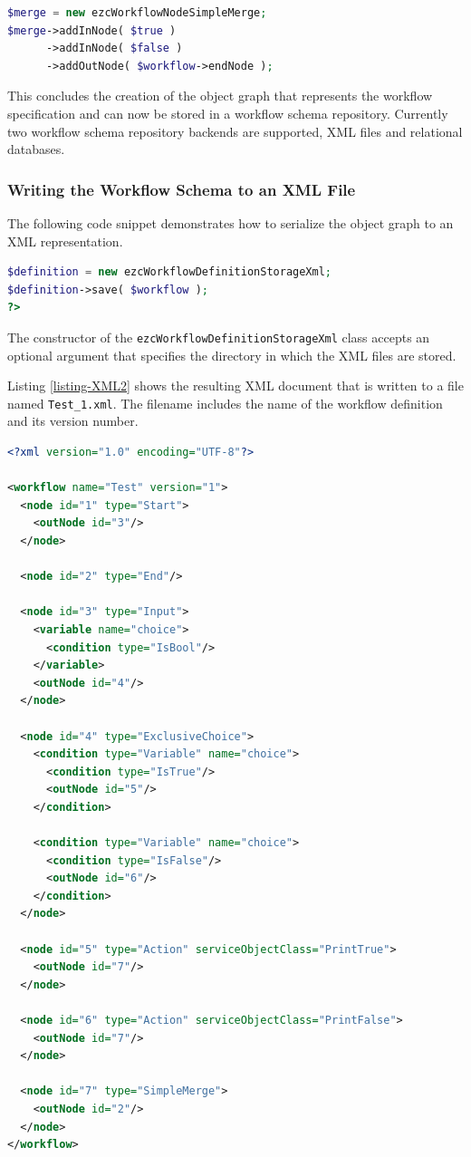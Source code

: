 \begin{lstlisting}[language=PHP,firstnumber=34]
$merge = new ezcWorkflowNodeSimpleMerge;
$merge->addInNode( $true )
      ->addInNode( $false )
      ->addOutNode( $workflow->endNode );
\end{lstlisting}

This concludes the creation of the object graph that represents the workflow
specification and can now be stored in a workflow schema repository. Currently
two workflow schema repository backends are supported, XML files and relational
databases.

\subsubsection{Writing the Workflow Schema to an XML File}

The following code snippet demonstrates how to serialize the object graph to
an XML representation.

\begin{lstlisting}[language=PHP,firstnumber=38]
$definition = new ezcWorkflowDefinitionStorageXml;
$definition->save( $workflow );
?>
\end{lstlisting}

The constructor of the \texttt{ezcWorkflowDefinitionStorageXml} class accepts an
optional argument that specifies the directory in which the XML files are
stored.

Listing \ref{listing-XML2} shows the resulting XML document that is written to
a file named \texttt{Test\_1.xml}. The filename includes the name of the
workflow definition and its version number.

\begin{lstlisting}[language=XML,firstnumber=1,stepnumber=100,float,caption={Workflow specification in XML markup},label=listing-XML2]
<?xml version="1.0" encoding="UTF-8"?>

<workflow name="Test" version="1">
  <node id="1" type="Start">
    <outNode id="3"/>
  </node>

  <node id="2" type="End"/>

  <node id="3" type="Input">
    <variable name="choice">
      <condition type="IsBool"/>
    </variable>
    <outNode id="4"/>
  </node>

  <node id="4" type="ExclusiveChoice">
    <condition type="Variable" name="choice">
      <condition type="IsTrue"/>
      <outNode id="5"/>
    </condition>

    <condition type="Variable" name="choice">
      <condition type="IsFalse"/>
      <outNode id="6"/>
    </condition>
  </node>

  <node id="5" type="Action" serviceObjectClass="PrintTrue">
    <outNode id="7"/>
  </node>

  <node id="6" type="Action" serviceObjectClass="PrintFalse">
    <outNode id="7"/>
  </node>

  <node id="7" type="SimpleMerge">
    <outNode id="2"/>
  </node>
</workflow>
\end{lstlisting}

